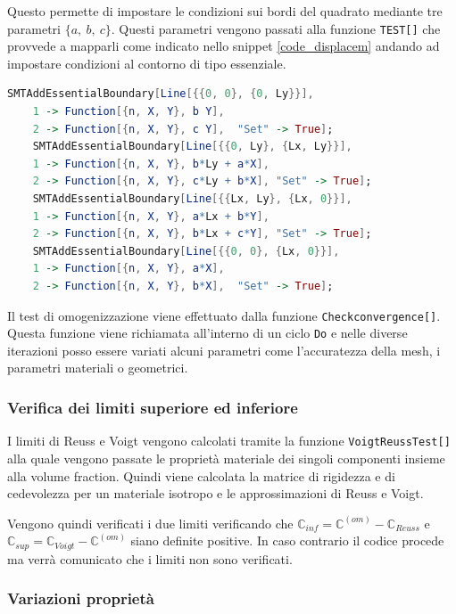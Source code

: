 \documentclass[a4paper,num-refs]{oup-contemporary}
\begin{document}
Questo permette di impostare le condizioni sui bordi del quadrato mediante tre parametri $\{a,\:b,\:c\}$. Questi parametri vengono passati alla funzione \texttt{TEST[]} che provvede a mapparli come indicato nello snippet  \ref{code_displacem} andando ad impostare condizioni al contorno di tipo essenziale.  

\begin{lstlisting}[language=Mathematica,caption=Algortimo per l'applicazione automatizzate delle condizioni al bordo,label=code_displacem]
	SMTAddEssentialBoundary[Line[{{0, 0}, {0, Ly}}],
	1 -> Function[{n, X, Y}, b Y],
	2 -> Function[{n, X, Y}, c Y], 	"Set" -> True];
	SMTAddEssentialBoundary[Line[{{0, Ly}, {Lx, Ly}}],
	1 -> Function[{n, X, Y}, b*Ly + a*X],
	2 -> Function[{n, X, Y}, c*Ly + b*X], "Set" -> True];
	SMTAddEssentialBoundary[Line[{{Lx, Ly}, {Lx, 0}}], 
	1 -> Function[{n, X, Y}, a*Lx + b*Y],
	2 -> Function[{n, X, Y}, b*Lx + c*Y], "Set" -> True];
	SMTAddEssentialBoundary[Line[{{0, 0}, {Lx, 0}}],
	1 -> Function[{n, X, Y}, a*X],
	2 -> Function[{n, X, Y}, b*X], 	"Set" -> True];
\end{lstlisting}


Il test di omogenizzazione viene effettuato dalla funzione \texttt{Checkconvergence[]}. Questa funzione viene richiamata all'interno di un ciclo \texttt{Do} e nelle diverse iterazioni posso essere variati alcuni parametri come l'accuratezza della mesh, i parametri materiali o geometrici. 


\subsubsection{Verifica dei limiti superiore ed inferiore}

I limiti di Reuss e Voigt vengono calcolati tramite la funzione \texttt{VoigtReussTest[]} alla quale vengono passate le proprietà materiale dei singoli componenti insieme alla volume fraction. Quindi viene calcolata la matrice di rigidezza e di cedevolezza per un materiale isotropo e le approssimazioni di Reuss e Voigt. 

Vengono quindi verificati i due limiti verificando che $\mathbb C_{inf}=\mathbb C^{(om)}-\mathbb C_{Reuss} $ e $\mathbb C_{sup}=\mathbb C_{Voigt} - \mathbb C^{(om)}$ siano definite positive. In caso contrario il codice procede ma verrà comunicato che i limiti non sono verificati. 


\subsubsection{Variazioni proprietà}
\end{document}
